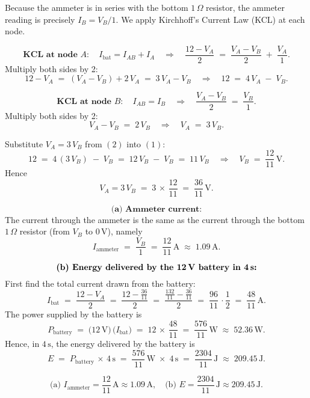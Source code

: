 \documentclass{article}
\begin{document}
Because the ammeter is in series with the bottom \(1\,\Omega\) resistor, the ammeter reading is precisely \(I_B = V_B/1\). We apply Kirchhoff’s Current Law (KCL) at each node.

\[
\textbf{KCL at node }A:\quad
I_{\text{bat}} = I_{AB} + I_A
\quad\Longrightarrow\quad
\frac{12 - V_A}{2} \;=\; \frac{V_A - V_B}{2} \;+\; \frac{V_A}{1}.
\]
Multiply both sides by 2:
\[
12 - V_A \;=\; (V_A - V_B) + 2\,V_A \;=\; 3\,V_A - V_B
\quad\Longrightarrow\quad
12 \;=\; 4\,V_A \;-\; V_B.
\tag{1}
\]

\[
\textbf{KCL at node }B:\quad
I_{AB} = I_B
\quad\Longrightarrow\quad
\frac{V_A - V_B}{2} \;=\; \frac{V_B}{1}.
\]
Multiply both sides by 2:
\[
V_A - V_B \;=\; 2\,V_B
\quad\Longrightarrow\quad
V_A \;=\; 3\,V_B.
\tag{2}
\]

Substitute \(V_A = 3\,V_B\) from \((2)\) into \((1)\):
\[
12 \;=\; 4\,(3\,V_B) \;-\; V_B
\;=\; 12\,V_B \;-\; V_B
\;=\; 11\,V_B
\quad\Longrightarrow\quad
V_B \;=\; \frac{12}{11}\,\mathrm{V}.
\]
Hence
\[
V_A = 3\,V_B \;=\; 3\,\times\,\frac{12}{11} \;=\; \frac{36}{11}\,\mathrm{V}.
\]

\[
\textbf{(a) Ammeter current:}
\]
The current through the ammeter is the same as the current through the bottom \(1\,\Omega\) resistor (from \(V_B\) to \(0\,\mathrm{V}\)), namely
\[
I_{\text{ammeter}} \;=\; \frac{V_B}{1} 
\;=\; \frac{12}{11}\,\mathrm{A}
\;\approx\; 1.09\,\mathrm{A}.
\]

\[
\textbf{(b) Energy delivered by the 12\,V battery in 4\,s:}
\]
First find the total current drawn from the battery:
\[
I_{\text{bat}} \;=\; \frac{12 - V_A}{2}
\;=\; \frac{12 - \tfrac{36}{11}}{2}
\;=\; \frac{\tfrac{132}{11} - \tfrac{36}{11}}{2}
\;=\; \frac{96}{11} \,\cdot \frac{1}{2}
\;=\; \frac{48}{11}\,\mathrm{A}.
\]
The power supplied by the battery is
\[
P_{\text{battery}} \;=\; \bigl(12\,\mathrm{V}\bigr)\,\bigl(I_{\text{bat}}\bigr)
\;=\; 12 \,\times\, \frac{48}{11}
\;=\; \frac{576}{11}\,\mathrm{W}
\;\approx\; 52.36\,\mathrm{W}.
\]
Hence, in \(4\,\mathrm{s}\), the energy delivered by the battery is
\[
E \;=\; P_{\text{battery}} \,\times\, 4\,\mathrm{s}
\;=\; \frac{576}{11}\,\mathrm{W} \;\times\; 4\,\mathrm{s}
\;=\; \frac{2304}{11}\,\mathrm{J}
\;\approx\; 209.45\,\mathrm{J}.
\]

\[
\boxed{
\text{(a) }I_{\text{ammeter}} = \frac{12}{11}\,\mathrm{A}\approx1.09\,\mathrm{A}, 
\quad
\text{(b) }E = \frac{2304}{11}\,\mathrm{J}\approx209.45\,\mathrm{J}.
}
\]
\end{document}
